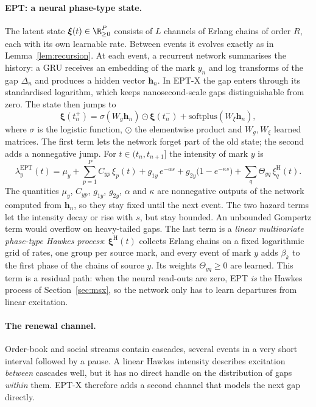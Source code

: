 \paragraph{EPT: a neural phase-type state.} The latent state $\bm\xi(t)\in\R_{\ge0}^P$ consists of
$L$ channels of Erlang chains of order $R$, each with its own learnable rate. Between events it
evolves exactly as in Lemma~\ref{lem:recursion}. At each event, a recurrent network summarises the
history: a GRU \citep{cho2014learning} receives an embedding of the mark $y_n$ and log transforms of
the gap $\Delta_n$ and produces a hidden vector $\bm h_n$. In EPT-X the gap enters through its
standardised logarithm, which keeps nanosecond-scale gaps distinguishable from zero. The state
then jumps to
\[
\bm\xi(t_n^+)=\sigma(W_g\bm h_n)\odot\bm\xi(t_n^-)+\mathrm{softplus}(W_\xi\bm h_n),
\]
where $\sigma$ is the logistic function, $\odot$ the elementwise product and $W_g,W_\xi$ learned
matrices. The first term lets the network forget part of the old state; the second adds a
nonnegative jump. For $t\in(t_n,t_{n+1}]$ the intensity of mark $y$ is
\begin{equation}\label{eq:ept}
\lambda^{\mathrm{EPT}}_y(t)=\mu_y+\sum_{p=1}^{P}C_{yp}\,\xi_p(t)
+g_{1y}\,e^{-\alpha s}+g_{2y}\bigl(1-e^{-\kappa s}\bigr)
+\sum_{q}\Theta_{yq}\,\xi^{\mathrm{H}}_q(t).
\end{equation}
The quantities $\mu_y$, $C_{yp}$, $g_{1y}$, $g_{2y}$, $\alpha$ and $\kappa$ are nonnegative outputs
of the network computed from $\bm h_n$, so they stay fixed until the next event. The two hazard
terms let the intensity decay or rise with $s$, but stay bounded. An unbounded Gompertz term would
overflow on heavy-tailed gaps. The last term is a \emph{linear multivariate phase-type Hawkes
process}: $\bm\xi^{\mathrm{H}}(t)$ collects Erlang chains on a fixed logarithmic grid of rates, one
group per source mark, and every event of mark $y$ adds $\beta_k$ to the first phase of the chains
of source $y$. Its weights $\Theta_{yq}\ge0$ are learned. This term is a residual path: when the
neural read-outs are zero, EPT \emph{is} the Hawkes process of Section~\ref{sec:msx}, so the network
only has to learn departures from linear excitation.

\paragraph{The renewal channel.} Order-book and social streams contain cascades, several events in
a very short interval followed by a pause. A linear Hawkes intensity describes excitation
\emph{between} cascades well, but it has no direct handle on the distribution of gaps
\emph{within} them. EPT-X therefore adds a second channel that models the next gap directly.

